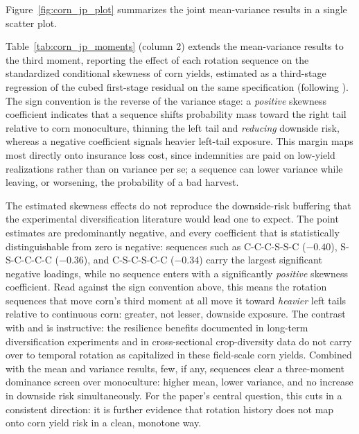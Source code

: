 \documentclass[12pt,letterpaper]{article}
\theoremstyle{remark}
\theoremstyle{remark}
\theoremstyle{plain}
\theoremstyle{definition}
\begin{document}
Figure~\ref{fig:corn_jp_plot} summarizes the joint mean-variance results in a single scatter plot.

Table~\ref{tab:corn_jp_moments} (column 2) extends the mean-variance results to the third moment, reporting the effect of each rotation sequence on the standardized conditional skewness of corn yields, estimated as a third-stage regression of the cubed first-stage residual on the same specification (following \citet{antle1983}). The sign convention is the reverse of the variance stage: a \emph{positive} skewness coefficient indicates that a sequence shifts probability mass toward the right tail relative to corn monoculture, thinning the left tail and \emph{reducing} downside risk, whereas a negative coefficient signals heavier left-tail exposure. This margin maps most directly onto insurance loss cost, since indemnities are paid on low-yield realizations rather than on variance per se; a sequence can lower variance while leaving, or worsening, the probability of a bad harvest.

The estimated skewness effects do not reproduce the downside-risk buffering that the experimental diversification literature would lead one to expect. The point estimates are predominantly negative, and every coefficient that is statistically distinguishable from zero is negative: sequences such as C-C-C-S-S-C ($-0.40$), S-S-C-C-C-C ($-0.36$), and C-S-C-S-C-C ($-0.34$) carry the largest significant negative loadings, while no sequence enters with a significantly \emph{positive} skewness coefficient. Read against the sign convention above, this means the rotation sequences that move corn's third moment at all move it toward \emph{heavier} left tails relative to continuous corn: greater, not lesser, downside exposure. The contrast with \citet{bowles2020} and \citet{difalco2009} is instructive: the resilience benefits documented in long-term diversification experiments and in cross-sectional crop-diversity data do not carry over to temporal rotation as capitalized in these field-scale corn yields. Combined with the mean and variance results, few, if any, sequences clear a three-moment dominance screen over monoculture: higher mean, lower variance, and no increase in downside risk simultaneously. For the paper's central question, this cuts in a consistent direction: it is further evidence that rotation history does not map onto corn yield risk in a clean, monotone way.
\end{document}
